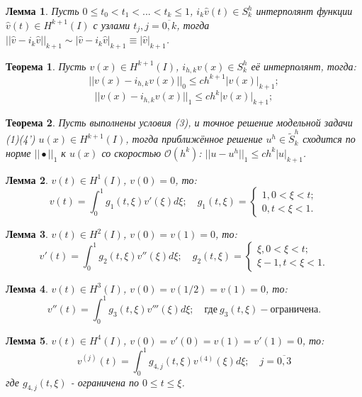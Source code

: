 \documentclass{article}
\newtheorem{theorem}{Теорема}
\newtheorem{lemma}{Лемма}
\begin{document}
\begin{lemma}
	Пусть $0 \leqslant t_0 < t_1 < ... < t_k \leqslant 1$, $i_k \hat{v}(t) \in S_k^h$ интерполянт функции $\hat{v}(t) \in H^{k+1}(I)$ с узлами $t_j, j = \overline{0,k}$, тогда $||\hat{v} - i_k \hat{v}||_{k+1} \sim |\hat{v} - i_k \hat{v}|_{k+1} \equiv |\hat{v}|_{k+1}$.
\end{lemma}

\begin{theorem}
	Пусть $v(x) \in H^{k+1}(I)$, $i_{h,k} v(x) \in S_k^h$ её интерполянт, тогда:
	\[
	||v(x) - i_{h,k} v(x)||_0 \leqslant c h^{k+1} |v(x)|_{k+1};	
	\]
	\[
	||v(x) - i_{h,k} v(x)||_1 \leqslant c h^{k} |v(x)|_{k+1};	
	\]
\end{theorem}

\begin{theorem}
	Пусть выполнены условия (3), и точное решение модельной задачи (1)(4') $u(x) \in H^{k+1}(I)$, тогда приближённое решение $u^h \in \tilde{S}_k^h$ сходится по норме $||\bullet||_1$ к $u(x)$ со скоростью $\mathcal{O}(h^k)$: $||u-u^h||_1 \leqslant c h^k |u|_{k+1}$.
\end{theorem}

\begin{lemma}
	$v(t) \in H^1(I)$, $v(0) = 0$, то:
	\[
	v(t) = \int_0^1 g_1(t,\xi) v'(\xi) d\xi; \quad g_1(t,\xi) = 
	\begin{cases}
	1, 0 < \xi < t;\\
	0, t < \xi < 1.
	\end{cases}	
	\]
\end{lemma}

\begin{lemma}
	$v(t) \in H^2(I)$, $v(0) = v(1) = 0$, то:
	\[
	v'(t) = \int_0^1 g_2(t,\xi) v''(\xi) d\xi; \quad g_2(t,\xi) = 
	\begin{cases}
	\xi, 0 < \xi < t;\\
	\xi - 1, t < \xi < 1.
	\end{cases}	
	\]
\end{lemma}

\begin{lemma}
	$v(t) \in H^3(I)$, $v(0) = v(1/2) = v(1) = 0$, то:
	\[
	v''(t) = \int_0^1 g_3(t,\xi) v'''(\xi) d\xi; \quad \text{где} \ g_3(t,\xi) - \text{ограничена}.
	\]
\end{lemma}

\begin{lemma}
	$v(t) \in H^4(I)$, $v(0) = v'(0) = v(1) = v'(1) = 0$, то:
	\[
	v^{(j)}(t) = \int_0^1 g_{4,j}(t,\xi) v^{(4)}(\xi) d\xi; \quad j = \overline{0,3} 
	\]
	где $g_{4,j}(t,\xi)$ - ограничена по $ 0 \leqslant t \leqslant \xi$.
\end{lemma}
\end{document}
